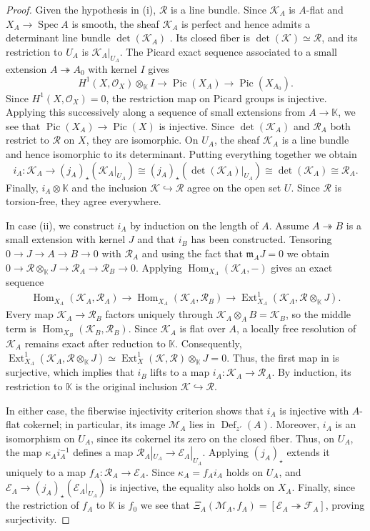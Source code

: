 \documentclass[leqno,11pt,a4paper]{amsart}
\theoremstyle{definition}
\numberwithin{equation}{section}
\newcommand{\kk}{\mathbb{K}}
\newcommand{\mfm}{\mathfrak{m}}
\newcommand{\EE}{\mathscr{E}}
\newcommand{\FF}{\mathscr{F}}
\newcommand{\OO}{\mathscr{O}}
\newcommand{\MM}{\mathscr{M}}
\newcommand{\RR}{\mathscr{R}}
\newcommand{\KK}{\mathscr{K}}
\DeclareMathOperator{\Hom}{Hom}
\DeclareMathOperator{\Ext}{Ext}
\DeclareMathOperator{\Def}{Def}
\DeclareMathOperator{\Spec}{Spec}
\begin{document}
\begin{proof}
Given the hypothesis in (i), $\RR$ is a line bundle.
Since $\KK_A$ is $A$-flat and $X_A\to\Spec A$ is smooth, the sheaf $\KK_A$ is perfect and hence admits a determinant line bundle $\det(\KK_A)$ \cite[Chapter I, Theorem 1]{KM76}.
Its closed fiber is $\det(\KK)\simeq\RR$, and its restriction to $U_A$ is $\KK_A|_{U_A}$.
The Picard exact sequence \cite[\href{https://stacks.math.columbia.edu/tag/0C6R}{Tag 0C6R}]{stacks_project} associated to a small extension $A\twoheadrightarrow A_0$ with kernel $I$ gives
$$
H^1(X,\OO_X)\otimes_\kk I
\longrightarrow \operatorname{Pic}(X_A)
\longrightarrow \operatorname{Pic}(X_{A_0}).
$$
Since $H^1(X,\OO_X)=0$, the restriction map on Picard groups is injective.
Applying this successively along a sequence of small extensions from $A\to \kk$, we see that
$\operatorname{Pic}(X_A)\to\operatorname{Pic}(X)$ is injective.
Since $\det(\KK_A)$ and $\RR_A$ both restrict to $\RR$ on $X$, they are isomorphic.
On $U_A$, the sheaf $\KK_A$ is a line bundle and hence isomorphic to its determinant. 
Putting everything together we obtain
$$
i_A: \KK_A\longrightarrow (j_{A})_\star(\KK_A|_{U_A}) \cong (j_{A})_\star(\det(\KK_A)|_{U_A})
\cong\det(\KK_A)
\cong \RR_A.
$$
Finally, $i_A \otimes \kk$ and the inclusion $\KK \hookrightarrow \RR$ agree on the open set $U$. 
Since $\RR$ is torsion-free, they agree everywhere.

In case (ii), we construct $i_A$ by induction on the length of $A$. Assume $A \twoheadrightarrow B$
is a small extension with kernel $J$ and that $i_B$ has been constructed.
Tensoring $0 \to J \to A \to B \to 0$ with $\RR_A$ and using the fact that $\mfm_AJ = 0$ we obtain
$ 0 \to \RR\otimes_\kk J \to \RR_A \to \RR_B \to 0$.
Applying $\Hom_{X_A}(\KK_A,-)$ gives an exact sequence
\begin{align} \label{some_seq}
\Hom_{X_A}(\KK_A,\RR_A)
\longrightarrow
\Hom_{X_A}(\KK_A,\RR_B)
\longrightarrow
\Ext^1_{X_A}(\KK_A,\RR\otimes_\kk J).
\end{align} 
Every map $\KK_A\to\RR_B$ factors uniquely through $\KK_A\otimes_A B=\KK_B$, so the middle term is
$\Hom_{X_B}(\KK_B,\RR_B)$.
Since $\KK_A$ is flat over $A$, a locally free resolution of $\KK_A$ remains exact after reduction to $\kk$.
Consequently, $\Ext^1_{X_A}(\KK_A,\RR\otimes_\kk J)\simeq \Ext^1_X(\KK,\RR)\otimes_\kk J=0$.
Thus, the first map in  is surjective, which implies that $i_B$ lifts to a map $i_A:\KK_A\to\RR_A$. By induction, its restriction to $\kk$ is the original inclusion $\KK\hookrightarrow\RR$.

In either case, the fiberwise injectivity criterion shows that  $i_A$ is injective with $A$-flat
cokernel; in particular, its image $\MM_A$ lies in $\Def_{z'}(A)$.
Moreover, $i_A$ is an isomorphism on $U_A$, since its cokernel its zero on the closed fiber.
Thus, on $U_A$, the map $\kappa_Ai_A^{-1}$ defines a map $\RR_A|_{U_A} \to \EE_A|_{U_A}$.
Applying $(j_{A})_\star$ extends it uniquely to a map $f_A:\RR_A\to\EE_A$.
Since $\kappa_A=f_Ai_A$ holds on $U_A$, and $\EE_A \to (j_A)_{\star}(\EE_A|_{U_A})$ is injective, the equality also holds on $X_A$.
Finally, since the restriction of $f_A$ to $\kk$ is $f_0$ we see that $\Xi_A(\MM_A,f_A) = [\EE_A\twoheadrightarrow \FF_A]$, proving surjectivity.


\end{proof}
\end{document}
